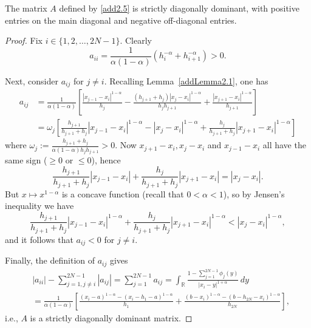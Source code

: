 \documentclass[smallextended]{svjour3}       %
\begin{document}
	
	
	
\begin{lemma}\label{addLemma2.2}
The matrix $A$ defined by \eqref{add2.5} is strictly diagonally dominant,  with positive entries on the main diagonal and negative off-diagonal entries.
\end{lemma}
\begin{proof}
Fix $i\in \{1,2,\dots, 2N-1\}$. Clearly 
		\begin{equation*}
			a_{ii}=\frac{1}{\alpha \left( 1-\alpha \right)}\left( h_{i}^{-\alpha}+h_{i+1}^{-\alpha} \right) >0.
		\end{equation*}
		
Next, consider $a_{ij}$ for  $j\ne i$.  Recalling Lemma~\ref{addLemma2.1},  one has
		\begin{equation*}
			\begin{split}
				a_{ij}
				&=\frac{1}{\alpha (1-\alpha )}\left[ \frac{\left| x_{j-1}-x_i \right|^{1-\alpha}}{h_j}- \frac{(h_{j+1}+h_{j})|x_j-x_i|^{1-\alpha }}{h_{j}h_{j+1}}
				+\frac{\left| x_{j+1}-x_i \right|^{1-\alpha}}{h_{j+1}} \right]\\
				&=\omega_{j} \left[ \frac{h_{j+1}}{h_{j+1}+h_{j}}\left| x_{j-1}-x_i \right|^{1-\alpha}-\left| x_j-x_i \right|^{1-\alpha}+\frac{h_j}{h_{j+1}+h_{j}}\left| x_{j+1}-x_i \right|^{1-\alpha} \right]
			\end{split}
		\end{equation*}
where $\omega_{j}:=\frac{h_{j+1}+h_{j}}{\alpha (1-\alpha )h_{j}h_{j+1}}>0$.
Now $x_{j+1}-x_i,x_{j}-x_i$ and $x_{j-1}-x_i$ all  have the same sign ($\ge 0$ or $\le 0$), hence
		\[\frac{h_{j+1}}{h_{j+1}+h_{j}}\left| x_{j-1}-x_i \right|+\frac{h_j}{h_{j+1}+h_{j}}\left| x_{j+1}-x_i \right|=\left| x_j-x_i \right|.\]
But $x\mapsto x^{1-\alpha}$ is a concave function  (recall that $0<\alpha<1$), so by Jensen's inequality we have
		\begin{equation*}
			\frac{h_{j+1}}{h_{j+1}+h_{j}}\left| x_{j-1}-x_i \right|^{1-\alpha}+\frac{h_j}{h_{j+1}+h_{j}}\left| x_{j+1}-x_i \right|^{1-\alpha}<\left| x_j-x_i \right|^{1-\alpha},
		\end{equation*}
and it follows that $a_{ij}<0$ for $j\ne i$.
		
Finally, the definition of $a_{ij}$ gives
\begin{equation*}%
			\begin{split}
&\left| a_{ii} \right| - \sum_{j=1,j\ne i}^{2N-1}{\left| a_{ij} \right|} = \sum_{j=1}^{2N-1}{a_{ij}} 
	= \int_{\mathbb{R}}{\frac{1-\sum_{j=1}^{2N-1}{\phi _j\left( y \right)}}{\left| x_i-y \right|^{1+\alpha}}\,dy}\\
	&= \frac{1}{\alpha \left( 1-\alpha \right)} 
\left[  \frac{\left( x_i-a \right) ^{1-\alpha}-\left( x_i-h_1-a \right) ^{1-\alpha}}{h_1}
	+\frac{\left( b-x_i \right) ^{1-\alpha}-\left( b-h_{2N}-x_i \right) ^{1-\alpha}}
		{h_{2N}} \right],
			\end{split}
\end{equation*}
i.e.,  $A$ is a strictly diagonally dominant matrix.
	\end{proof}
	
\end{document}
